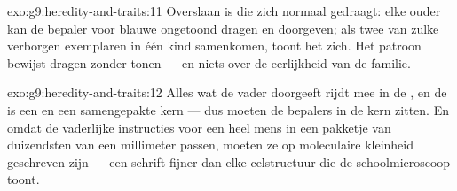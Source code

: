 \begin{solution}{exo:g9:heredity-and-traits:11}
Overslaan is  die zich normaal gedraagt: elke ouder
kan de bepaler voor blauwe  ongetoond dragen en doorgeven;
als twee van zulke verborgen exemplaren in één kind samenkomen,
toont het  zich. Het patroon bewijst dragen zonder
tonen --- en niets over de eerlijkheid van de familie.
\end{solution}

\begin{solution}{exo:g9:heredity-and-traits:12}
Alles wat de vader doorgeeft rijdt mee in de , en de
 is een  en een samengepakte kern --- dus moeten
de bepalers in de kern zitten. En omdat de vaderlijke
instructies voor een heel mens in een pakketje van duizendsten
van een millimeter passen, moeten ze op moleculaire kleinheid
geschreven zijn --- een schrift fijner dan elke celstructuur
die de schoolmicroscoop toont.
\end{solution}


